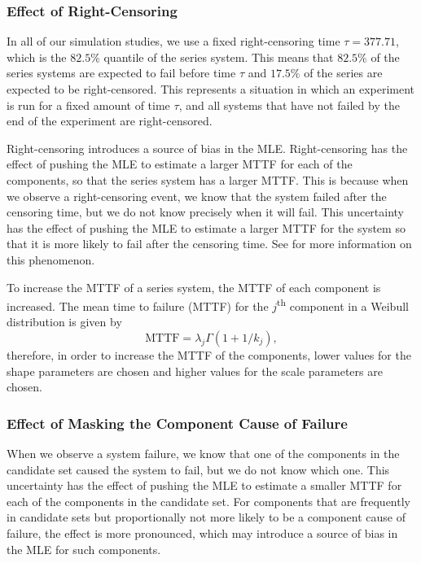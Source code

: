 \documentclass[
]{article}
\begin{document}
\hypertarget{sec:effect-censoring}{%
\subsubsection{Effect of Right-Censoring}\label{sec:effect-censoring}}

In all of our simulation studies, we use a fixed right-censoring time
\(\tau = 377.71\), which is the \(82.5\%\) quantile of the series
system. This means that \(82.5\%\) of the series systems are expected to
fail before time \(\tau\) and \(17.5\%\) of the series are expected to
be right-censored. This represents a situation in which an experiment is
run for a fixed amount of time \(\tau\), and all systems that have not
failed by the end of the experiment are right-censored.

Right-censoring introduces a source of bias in the MLE. Right-censoring
has the effect of pushing the MLE to estimate a larger MTTF for each of
the components, so that the series system has a larger MTTF. This is
because when we observe a right-censoring event, we know that the system
failed after the censoring time, but we do not know precisely when it
will fail. This uncertainty has the effect of pushing the MLE to
estimate a larger MTTF for the system so that it is more likely to fail
after the censoring time. See \cite{klein2005survival} for more
information on this phenomenon.

To increase the MTTF of a series system, the MTTF of each component is
increased. The mean time to failure (MTTF) for the
\(j\)\textsuperscript{th} component in a Weibull distribution is given
by \begin{equation}
\label{eq:mttf-wei}
\text{MTTF} = \lambda_j \Gamma(1 + 1/k_j),
\end{equation} therefore, in order to increase the MTTF of the
components, lower values for the shape parameters are chosen and higher
values for the scale parameters are chosen.

\hypertarget{sec:effect-masking}{%
\subsubsection{Effect of Masking the Component Cause of
Failure}\label{sec:effect-masking}}

When we observe a system failure, we know that one of the components in
the candidate set caused the system to fail, but we do not know which
one. This uncertainty has the effect of pushing the MLE to estimate a
smaller MTTF for each of the components in the candidate set. For
components that are frequently in candidate sets but proportionally not
more likely to be a component cause of failure, the effect is more
pronounced, which may introduce a source of bias in the MLE for such
components.
\end{document}
